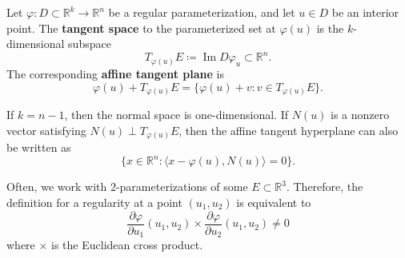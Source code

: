 	\begin{definition}
		Let $\varphi: D \subset \mathbb{R}^k \to \mathbb{R}^n$ be a regular parameterization, and let $u \in D$ be an interior point. The \textbf{tangent space} to the parameterized set at $\varphi(u)$ is the $k$-dimensional subspace
		\begin{equation}
			T_{\varphi(u)}E \coloneqq \operatorname{Im} D\varphi_u \subset \mathbb{R}^n.
		\end{equation}
		The corresponding \textbf{affine tangent plane} is
		\begin{equation}
			\varphi(u) + T_{\varphi(u)}E = \{ \varphi(u) + v : v \in T_{\varphi(u)}E \}.
		\end{equation}
	\end{definition}
			
	If $k=n-1$, then the normal space is one-dimensional. If $N(u)$ is a nonzero vector satisfying $N(u) \perp T_{\varphi(u)}E$, then the affine tangent hyperplane can also be written as
	\begin{equation}
		\{x \in \mathbb{R}^n : \langle x - \varphi(u), N(u) \rangle = 0\}.
	\end{equation}
			
	Often, we work with $2$-parameterizations of some $E \subset\mathbb{R}^3$. Therefore, the definition for a regularity at a point $(u_1, u_2)$ is equivalent to 
	\begin{equation}
		\frac{\partial \varphi}{\partial u_1} (u_1, u_2) \times \frac{\partial \varphi}{\partial u_2} (u_1, u_2) \neq 0
	\end{equation}
	where $\times$ is the Euclidean cross product. 
			
